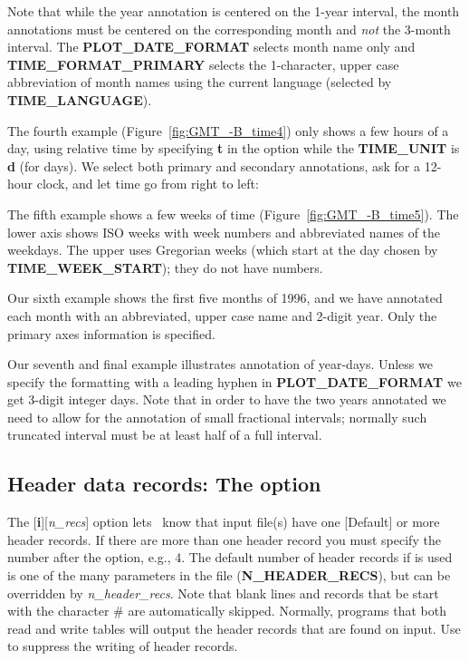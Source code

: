 
Note that while the year annotation is centered on the 1-year interval, the month annotations must be centered
on the corresponding month and \emph{not} the 3-month interval.  The \textbf{PLOT\_DATE\_FORMAT} selects month
name only and \textbf{TIME\_FORMAT\_PRIMARY} selects the 1-character, upper case abbreviation of month names using
the current language (selected by \textbf{TIME\_LANGUAGE}).

The fourth example (Figure~\ref{fig:GMT_-B_time4}) only shows a few hours of a day, using relative time by
specifying \textbf{t} in the  option while the \textbf{TIME\_UNIT} is \textbf{d} (for days).
We select both primary and
secondary annotations, ask for a 12-hour clock, and let time go from right to left:


The fifth example shows a few weeks of time (Figure~\ref{fig:GMT_-B_time5}).  The lower axis shows ISO weeks with
week numbers and abbreviated names of the weekdays.   The upper uses Gregorian weeks (which start at the day chosen
by \textbf{TIME\_WEEK\_START}); they do not have numbers.

Our sixth example shows the first five months of 1996, and we have annotated each month with an abbreviated, upper case
name and 2-digit year.  Only the primary axes information is specified.


Our seventh and final example illustrates annotation of year-days.  Unless we specify the formatting with a leading hyphen
in  \textbf{PLOT\_DATE\_FORMAT} we get 3-digit integer days.  Note that in order to have the two years
annotated we need to allow for the annotation of small fractional intervals; normally such truncated interval must
be at least half of a full interval.


\subsection{Header data records: The  option}
\label{sec:header}
The [\textbf{i}][\emph{n\_recs}] option lets \GMT\ know that input file(s) have
one [Default] or more header records.  If there are more than one header
record you must specify the number after the  option, e.g., 4.  The
default number of header records if  is used is one of the many parameters
in the  file (\textbf{N\_HEADER\_RECS}), but can be overridden
by \emph{n\_header\_recs}.
Note that blank lines and records that be start with the character \# are
automatically skipped.  Normally, programs that both read and write tables will
output the header records that are found on input.  Use  to suppress the
writing of header records.

